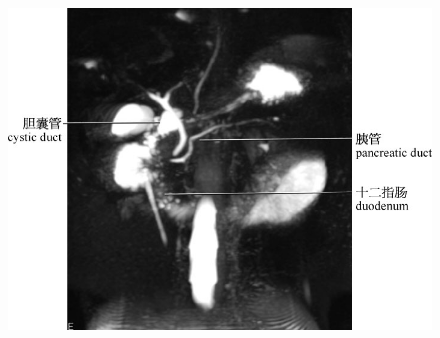 \begin{figure}[!htbp]
 \centering
 \includegraphics{./images/Image00165.jpg}
  \end{figure} 
 \FloatBarrier

